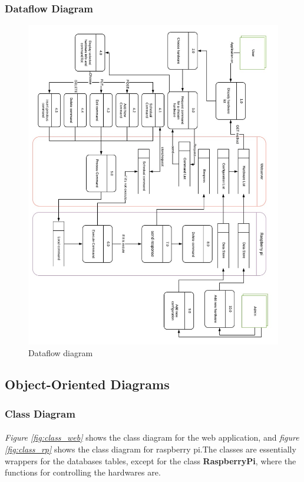 \documentclass[12pt, oneside, a4paper]{book}
\begin{document}
			
				\newpage\subsubsection{Dataflow Diagram}
				\begin{figure}[H]
					\includegraphics[width=\linewidth]{img/diagram_dataflow.jpg}
					\caption{Dataflow diagram}
				\end{figure}
				\newpage\subsection{Object-Oriented Diagrams}
				\subsubsection{Class Diagram}
					\paragraph{} \textit{Figure \ref{fig:class_web}} shows the class diagram for the web application, and \textit{figure \ref{fig:class_rp}} shows the class diagram for raspberry pi.The classes are essentially wrappers for the databases tables, except for the class \textbf{RaspberryPi}, where the functions for controlling the hardwares are.
\end{document}
